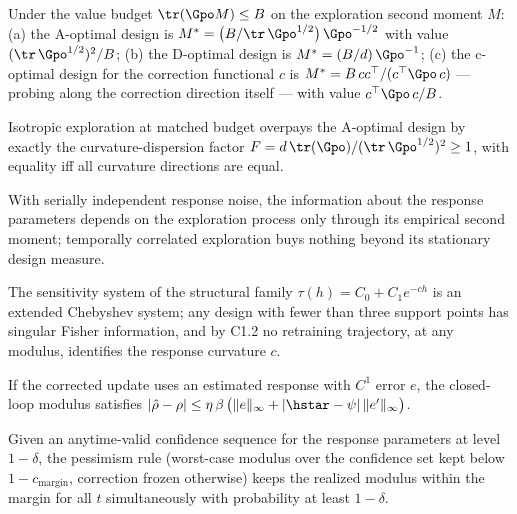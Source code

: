 \documentclass[11pt]{article}
\begin{document}
\begin{theorem}
Under the value budget $\tr(\Gpo M) \le B$ on the exploration second
moment $M$:
(a) the A-optimal design is $M^{*} = \big(B/\tr\,\Gpo^{1/2}\big)\,
\Gpo^{-1/2}$ with value $(\tr\,\Gpo^{1/2})^2/B$;
(b) the D-optimal design is $M^{*} = (B/d)\,\Gpo^{-1}$;
(c) the c-optimal design for the correction functional $c$ is
$M^{*} = B\,cc^\top/(c^\top \Gpo\, c)$ --- probing along the correction
direction itself --- with value $c^\top \Gpo\, c / B$.
\end{theorem}

\begin{corollary}
Isotropic exploration at matched budget overpays the A-optimal design by
exactly the curvature-dispersion factor
$F = d\,\tr(\Gpo)/(\tr\,\Gpo^{1/2})^2 \ge 1$, with equality iff all
curvature directions are equal.
\end{corollary}

\begin{lemma}
With serially independent response noise, the information about the
response parameters depends on the exploration process only through its
empirical second moment; temporally correlated exploration buys nothing
beyond its stationary design measure.
\end{lemma}

\begin{theorem}
The sensitivity system of the structural family
$\tau(h) = C_0 + C_1 e^{-ch}$ is an extended Chebyshev system; any design
with fewer than three support points has singular Fisher information, and
by C1.2 no retraining trajectory, at any modulus, identifies the response
curvature $c$.
\end{theorem}

\begin{lemma}
If the corrected update uses an estimated response with $C^1$ error $e$,
the closed-loop modulus satisfies
$|\hat\rho - \rho| \le \eta\,\beta\,\big(\|e\|_\infty +
|\hstar-\psi|\,\|e'\|_\infty\big)$.
\end{lemma}

\begin{proposition}
Given an anytime-valid confidence sequence for the response parameters at
level $1-\delta$, the pessimism rule (worst-case modulus over the
confidence set kept below $1 - c_{\mathrm{margin}}$, correction frozen
otherwise) keeps the realized modulus within the margin for all $t$
simultaneously with probability at least $1-\delta$.
\end{proposition}
\end{document}
